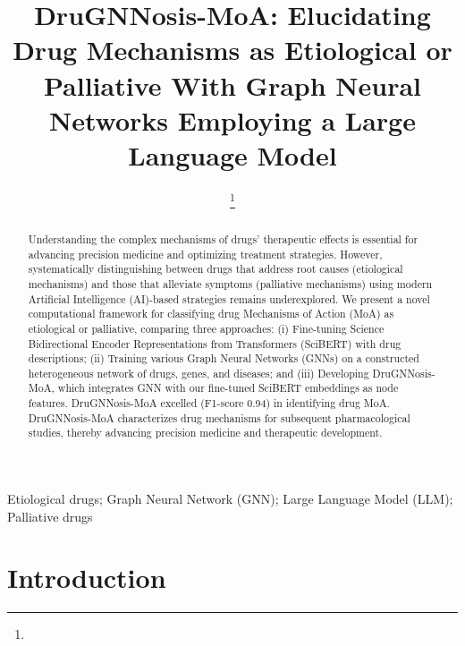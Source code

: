 \documentclass[journal,twoside,web]{ieeecolor}
\begin{document}
\title{DruGNNosis-MoA: Elucidating Drug Mechanisms as Etiological or Palliative With Graph Neural Networks Employing a Large Language Model}
\author{
\thanks{
}
}
\maketitle






\begin{abstract}
Understanding the complex mechanisms of drugs' therapeutic effects is essential for advancing precision medicine and optimizing treatment strategies. 
However, systematically distinguishing between drugs that address root causes (etiological mechanisms) and those that alleviate symptoms (palliative mechanisms) using modern Artificial Intelligence (AI)-based strategies remains underexplored.
We present a novel computational framework for classifying drug Mechanisms of Action (MoA) as etiological or palliative, comparing three approaches: 
(i) Fine-tuning Science Bidirectional Encoder Representations from Transformers (SciBERT) with drug descriptions; 
(ii) Training various Graph Neural Networks (GNNs) on a constructed heterogeneous network of drugs, genes, and diseases; and 
(iii) Developing DruGNNosis-MoA, which integrates GNN with our fine-tuned SciBERT embeddings as node features. 
DruGNNosis-MoA excelled (F1-score 0.94) in identifying drug MoA. 
DruGNNosis-MoA characterizes drug mechanisms for subsequent pharmacological studies, thereby advancing precision medicine and therapeutic development.
\end{abstract}

\begin{IEEEkeywords}
Etiological drugs;
Graph Neural Network (GNN);
Large Language Model (LLM);
Palliative drugs
\end{IEEEkeywords}

\section{Introduction}
\label{sec:intro}
\end{document}
